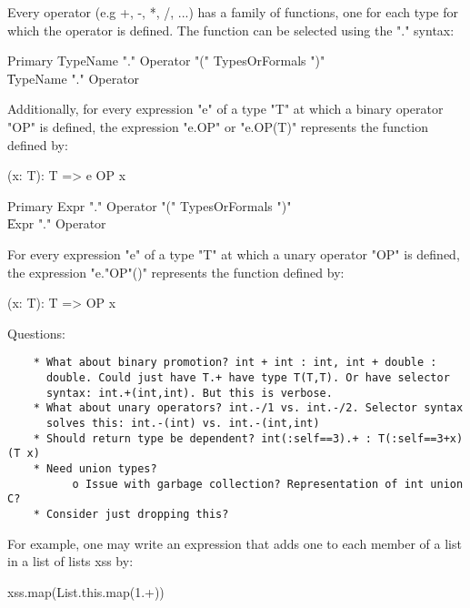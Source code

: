 Every operator (e.g +, -, *, /, ...) has a family of functions, one for
each type for which the operator is defined. The function can be
selected using the "." syntax:

\begin{grammar}
Primary \: TypeName \xcd"." Operator \xcd"(" TypesOrFormals \xcd")" \\
        \| TypeName \xcd"." Operator \\
\end{grammar}

Additionally, for every expression \xcd"e" of a type \xcd"T" at which a binary
operator \xcd"OP" is defined, the expression \xcd"e.OP" or
\xcd"e.OP(T)" represents the function
defined by:

\begin{xten}
(x: T): T => { e OP x }
\end{xten}

\begin{grammar}
Primary \: Expr \xcd"." Operator \xcd"(" TypesOrFormals \xcd")" \\
        \| Expr \xcd"." Operator \\
\end{grammar}

For every expression \xcd"e" of a type \xcd"T" at which a unary
operator \xcd"OP" is defined, the expression \xcd"e."OP\xcd"()" represents the function
defined by:

\begin{xten}
(x: T): T => { OP x }
\end{xten}

Questions:

\begin{verbatim}
    * What about binary promotion? int + int : int, int + double :
      double. Could just have T.+ have type T(T,T). Or have selector
      syntax: int.+(int,int). But this is verbose.
    * What about unary operators? int.-/1 vs. int.-/2. Selector syntax
      solves this: int.-(int) vs. int.-(int,int)
    * Should return type be dependent? int(:self==3).+ : T(:self==3+x)(T x)
    * Need union types?
          o Issue with garbage collection? Representation of int union C? 
    * Consider just dropping this? 
\end{verbatim}


For example,
one may write an expression that adds one to each member of a list in a
list of lists xss by:

\begin{xten}
xss.map(List.this.map(1.+))
\end{xten}

